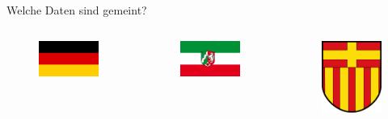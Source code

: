 \begin{frame}[t]{Welche Daten sind gemeint?}
 \begin{columns}
  \begin{figure}[h]
   \centering
   \includegraphics[scale=0.3]{section_open_data_flag_germany.png}
  \end{figure}
  \begin{figure}[h]
   \centering
   \includegraphics[scale=0.3]{section_open_data_flag_nrw.png}
  \end{figure}
  
  \begin{figure}[h]
   \centering
   \includegraphics[scale=0.3]{section_open_data_flag_paderborn.png}
  \end{figure}
 \end{columns}
 

\end{frame}
